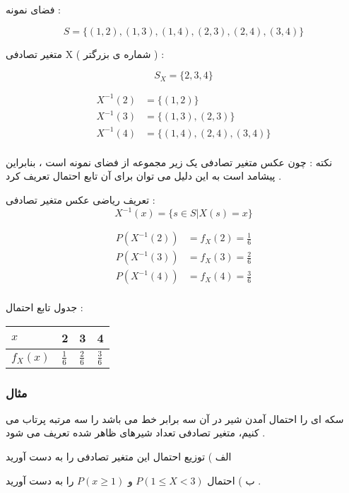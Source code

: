\documentclass[12pt]{book}
\begin{document}
فضای نمونه :

$$
S = \{ ( 1 , 2 ), ( 1 , 3 ), ( 1 , 4 ), ( 2 , 3 ), ( 2 , 4 ), ( 3 , 4 ) \}
$$


متغیر تصادفی X ( شماره ی بزرگتر ) :

$$
S_{X} = \{ 2 , 3 , 4 \}
$$


\begin{align*}
X^{-1}(2) &= \{  ( 1 , 2 ) \} \\
X^{-1}(3) &= \{  ( 1 , 3 ),  ( 2 , 3 ) \} \\
X^{-1}(4) &= \{  ( 1 , 4 ), ( 2 , 4 ), ( 3 , 4 ) \} \\
\end{align*}


نکته : چون عکس متغیر تصادفی یک زیر مجموعه از فضای نمونه است ، بنابراین پیشامد است به این دلیل می توان برای آن تابع احتمال تعریف کرد .

تعریف ریاضی عکس متغیر تصادفی :
$$
X^{-1}(x) = \{ s \in S | X(s) = x \}
$$


\begin{align*}
P(X^{-1}(2)) &= f_{X}(2) = \frac{1}{6} \\
P(X^{-1}(3)) &= f_{X}(3) = \frac{2}{6} \\
P(X^{-1}(4)) &= f_{X}(4) = \frac{3}{6} \\
\end{align*}

جدول تابع احتمال :

\begin{center}
\begin{latin}
\begin{tabular}{ l |  l  l  l  }
  $x$ & 2 & 3 & 4  \\
  \hline
  $f_{X}(x)$ & $\frac{1}{6}$ & $\frac{2}{6}$ & $\frac{3}{6}$  \\
\end{tabular}
\end{latin}
\end{center}


\subsubsection{مثال}

سکه ای را احتمال آمدن شیر در آن سه برابر خط می باشد را سه مرتبه پرتاب می کنیم، متغیر تصادفی تعداد شیرهای ظاهر شده تعریف می شود .

الف ) توزیع احتمال این متغیر تصادفی را به دست آورید

ب ) احتمال 
$P(1 \leq X < 3)$
و 
$P(x \geq 1)$
را به دست آورید .
\end{document}
